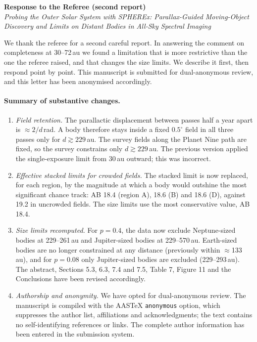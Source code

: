 \documentclass[11pt]{article}
\begin{document}
\begin{center}
{\large\bfseries Response to the Referee (second report)}\\[4pt]
\emph{Probing the Outer Solar System with SPHEREx: Parallax-Guided Moving-Object Discovery and Limits on Distant Bodies in All-Sky Spectral Imaging}
\end{center}

We thank the referee for a second careful report. In answering the comment on completeness at 30--72\,au we found a limitation that is more restrictive than the one the referee raised, and that changes the size limits. We describe it first, then respond point by point. This manuscript is submitted for dual-anonymous review, and this letter has been anonymised accordingly.

\paragraph{Summary of substantive changes.}
\begin{enumerate}
\item \emph{Field retention.} The parallactic displacement between passes half a year apart is $\approx 2/d$\,rad. A body therefore stays inside a fixed $0.5^\circ$ field in all three passes only for $d \gtrsim 229$\,au. The survey fields along the Planet Nine path are fixed, so the survey constrains only $d \gtrsim 229$\,au. The previous version applied the single-exposure limit from 30\,au outward; this was incorrect.
\item \emph{Effective stacked limits for crowded fields.} The stacked limit is now replaced, for each region, by the magnitude at which a body would outshine the most significant chance track: AB 18.4 (region A), 18.6 (B) and 18.6 (D), against 19.2 in uncrowded fields. The size limits use the most conservative value, AB 18.4.
\item \emph{Size limits recomputed.} For $p = 0.4$, the data now exclude Neptune-sized bodies at 229--261\,au and Jupiter-sized bodies at 229--570\,au. Earth-sized bodies are no longer constrained at any distance (previously within $\approx$133\,au), and for $p = 0.08$ only Jupiter-sized bodies are excluded (229--293\,au). The abstract, Sections 5.3, 6.3, 7.4 and 7.5, Table 7, Figure 11 and the Conclusions have been revised accordingly.
\item \emph{Authorship and anonymity.} We have opted for dual-anonymous review. The manuscript is compiled with the AASTeX \texttt{anonymous} option, which suppresses the author list, affiliations and acknowledgments; the text contains no self-identifying references or links. The complete author information has been entered in the submission system.
\end{enumerate}
\end{document}
